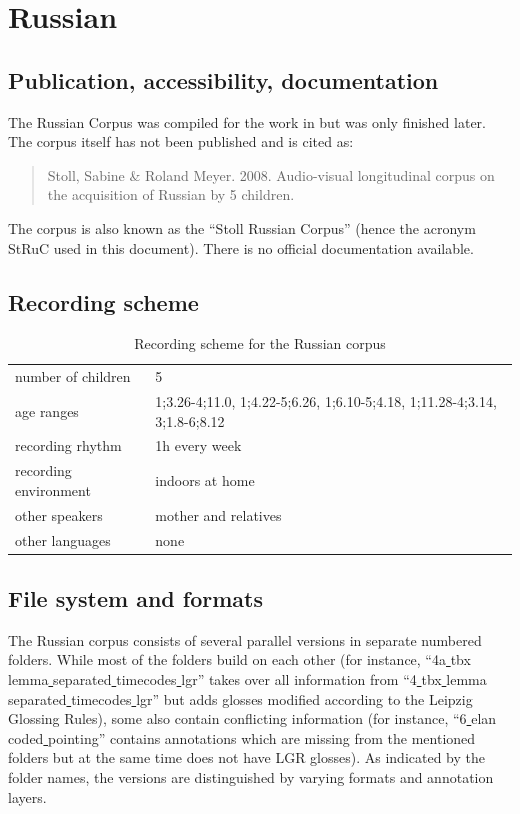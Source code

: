 \documentclass[a4paper, 11pt]{book}
\newcommand{\und}{\underline{{ }}\hspace{0.2mm}}	%
\begin{document}
\section{Russian}
\label{sec:Russian}

\subsection{Publication, accessibility, documentation}

The Russian Corpus \citep{Stoll_etal2008a} was compiled for the work in \citet{Stoll2001a} but was only finished later. The corpus itself has not been published and is cited as:

\begin{quote}
	Stoll, Sabine \& Roland Meyer. 2008. Audio-visual longitudinal corpus on the acquisition of Russian by 5 children.
\end{quote}

\noindent The corpus is also known as the “Stoll Russian Corpus” (hence the acronym StRuC used in this document). There is no official documentation available. 


\subsection{Recording scheme}

\begin{table}[ht!]
	\centering
	\begin{tabular}{ll}
		\toprule
		number of children 	& 5 \\
		age ranges 			& 1;3.26-4;11.0, 1;4.22-5;6.26, 1;6.10-5;4.18, 1;11.28-4;3.14, 3;1.8-6;8.12 \\
		recording rhythm 	& 1h every week \\
		recording environment & indoors at home \\
		other speakers 		& mother and relatives \\
		other languages		& none \\
		\bottomrule
	\end{tabular}
	\caption{Recording scheme for the Russian corpus}
	\label{tab:Russian recording scheme}
\end{table}


\subsection{File system and formats}

The Russian corpus consists of several parallel versions in separate numbered folders. While most of the folders build on each other (for instance, “4a\und tbx\und lemma\und separated\und timecodes\und lgr” takes over all information from “4\und tbx\und lemma\und separated\und timecodes\und lgr” but adds glosses modified according to the Leipzig Glossing Rules), some also contain conflicting information (for instance, “6\und elan\und coded\und pointing” contains annotations which are missing from the mentioned folders but at the same time does not have LGR glosses). As indicated by the folder names, the versions are distinguished by varying formats and annotation layers. 
\end{document}
